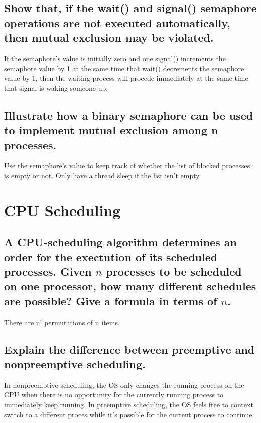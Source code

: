 \documentclass{book}%
\begin{document}
\section{Show that, if the wait() and signal() semaphore operations are not
executed automatically, then mutual exclusion may be violated.}
If the semaphore's value is initially zero and one signal() increments the
semaphore value by 1 at the same time that wait() decrements the semaphore
value by 1, then the waiting process will procede immediately at the same time
that signal is waking someone up.
\section{Illustrate how a binary semaphore can be used to implement mutual
exclusion among n processes.}
Use the semaphore's value to keep track of whether the list of blocked processes
is empty or not. Only have a thread sleep if the list isn't empty.
\chapter{CPU Scheduling}
\section{A CPU-scheduling algorithm determines an order for the exectution of 
its scheduled processes. Given $n$ processes to be scheduled on one processor,
how many different schedules are possible? Give a formula in terms of $n$.}
There are n! permutations of n items.
\section{Explain the difference between preemptive and nonpreemptive 
scheduling.}
In nonpreemptive scheduling, the OS only changes the running process on the CPU
when there is no opportunity for the currently running process to immediately
keep running. In preemptive scheduling, the OS feels free to context switch to
a different proces while it's possible for the current process to continue.
\end{document}
